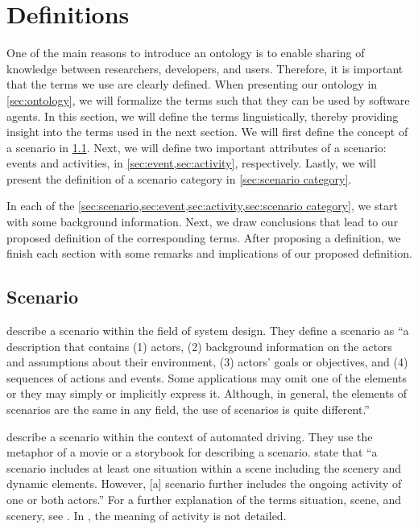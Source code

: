 \section{Definitions}
\label{sec:definitions}

One of the main reasons to introduce an ontology is to enable sharing of knowledge between researchers, developers, and users. 
Therefore, it is important that the terms we use are clearly defined. 
When presenting our ontology in \cref{sec:ontology}, we will formalize the terms such that they can be used by software agents.
In this section, we will define the terms linguistically, thereby providing insight into the terms used in the next section.
We will first define the concept of a scenario in \cref{sec:scenario}. 
Next, we will define two important attributes of a scenario: events and activities, in \cref{sec:event,sec:activity}, respectively. 
Lastly, we will present the definition of a scenario category in \cref{sec:scenario category}.

\cbstartc
In each of the \cref{sec:scenario,sec:event,sec:activity,sec:scenario category}, we start with some background information. Next, we draw conclusions that lead to our proposed definition of the corresponding terms. After proposing a definition, we finish each section with some remarks and implications of our proposed definition.
\cbend



\subsection{Scenario}
\label{sec:scenario}

\textcite{go2004blind} describe a scenario within the field of system design. They define a scenario as ``a description that contains (1) actors, (2) background information on the actors and assumptions about their environment, (3) actors' goals or objectives, and (4) sequences of actions and events. Some applications may omit one of the elements or they may simply or implicitly express it. Although, in general, the elements of scenarios are the same in any field, the use of scenarios is quite different.'' 

\textcite{geyer2014} describe a scenario within the context of automated driving. They use the metaphor of a movie or a storybook for describing a scenario. \textcite{geyer2014} state that ``a scenario includes at least one situation within a scene including the scenery and dynamic elements. However, [a] scenario further includes the ongoing activity of one or both actors.'' For a further explanation of the terms situation, scene, and scenery, see \cite{geyer2014}. 
In \cite{geyer2014}, the meaning of activity is not detailed.

